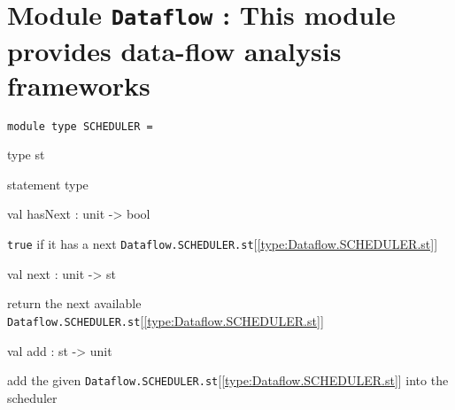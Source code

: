 \documentclass[11pt]{article}
\begin{document}
\section{Module {\tt{Dataflow}} : This module provides data-flow analysis frameworks}
\label{module:Dataflow}




\ocamldocvspace{0.5cm}



\begin{ocamldoccode}
{\tt{module type }}{\tt{SCHEDULER}}{\tt{ = }}\end{ocamldoccode}
\label{moduletype:Dataflow.SCHEDULER}

\begin{ocamldocsigend}


\label{type:Dataflow.SCHEDULER.st}\begin{ocamldoccode}
type st 
\end{ocamldoccode}
\begin{ocamldocdescription}
statement type


\end{ocamldocdescription}


\label{val:Dataflow.SCHEDULER.hasNext}\begin{ocamldoccode}
val hasNext : unit -> bool
\end{ocamldoccode}
\begin{ocamldocdescription}
{\tt{true}} if it has a next {\tt{Dataflow.SCHEDULER.st}}[\ref{type:Dataflow.SCHEDULER.st}]


\end{ocamldocdescription}


\label{val:Dataflow.SCHEDULER.next}\begin{ocamldoccode}
val next : unit -> st
\end{ocamldoccode}
\begin{ocamldocdescription}
return the next available {\tt{Dataflow.SCHEDULER.st}}[\ref{type:Dataflow.SCHEDULER.st}]


\end{ocamldocdescription}


\label{val:Dataflow.SCHEDULER.add}\begin{ocamldoccode}
val add : st -> unit
\end{ocamldoccode}
\begin{ocamldocdescription}
add the given {\tt{Dataflow.SCHEDULER.st}}[\ref{type:Dataflow.SCHEDULER.st}] into the scheduler


\end{ocamldocdescription}
\end{ocamldocsigend}
\end{document}
